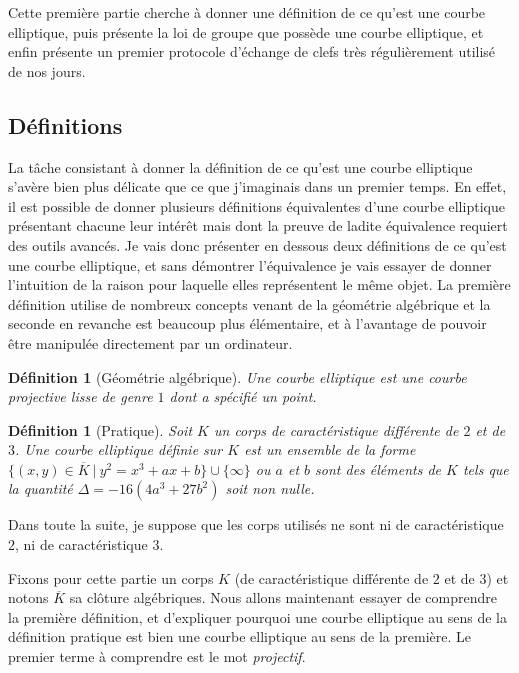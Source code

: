 \documentclass{article}
\theoremstyle{plain}%
\newtheorem{deff}[thm]{Définition}
\theoremstyle{definition}%
\newcommand{\ol}{\overline}
\begin{document}
Cette première partie cherche à donner une définition de ce qu'est une courbe elliptique, puis présente la loi de groupe que possède une courbe elliptique, et enfin présente un premier protocole d'échange de clefs très régulièrement utilisé de nos jours.


\subsection{Définitions}

La tâche consistant à donner la définition de ce qu'est une courbe elliptique s'avère bien plus délicate que ce que j'imaginais dans un premier temps. En effet, il est possible de donner plusieurs définitions équivalentes d'une courbe elliptique présentant chacune leur intérêt mais dont la preuve de ladite équivalence requiert des outils avancés. Je vais donc présenter en dessous deux définitions de ce qu'est une courbe elliptique, et sans démontrer l'équivalence je vais essayer de donner l'intuition de la raison pour laquelle elles représentent le même objet. La première définition utilise de nombreux concepts venant de la géométrie algébrique et la seconde en revanche est beaucoup plus élémentaire, et à l'avantage de pouvoir être manipulée directement par un ordinateur.

\begin{deff}[Géométrie algébrique]
  Une courbe elliptique est une courbe projective lisse de genre $1$ dont a spécifié un point.
\end{deff}

\begin{deff}[Pratique]
  Soit $K$ un corps de caractéristique différente de $2$ et de $3$. Une courbe elliptique définie sur $K$ est un ensemble de la forme $\{(x, y)\in\ol K\ |\ y^2 = x^3 + ax +b\}\cup\{\infty\}$ ou $a$ et $b$ sont des éléments de $K$ tels que la quantité $\Delta =-16(4a^3+ 27b^2)$ soit non nulle.
\end{deff}

\begin{center}
  \color{red}
  Dans toute la suite, je suppose que les corps utilisés ne sont ni de caractéristique $2$, ni de caractéristique $3$.
\end{center}

Fixons pour cette partie un corps $K$ (de caractéristique différente de $2$ et de $3$) et notons $\overline{K}$ sa clôture algébriques. Nous allons maintenant essayer de comprendre la première définition, et d'expliquer pourquoi une courbe elliptique au sens de la définition pratique est bien une courbe elliptique au sens de la première. Le premier terme à comprendre est le mot \emph{projectif}.
\end{document}
